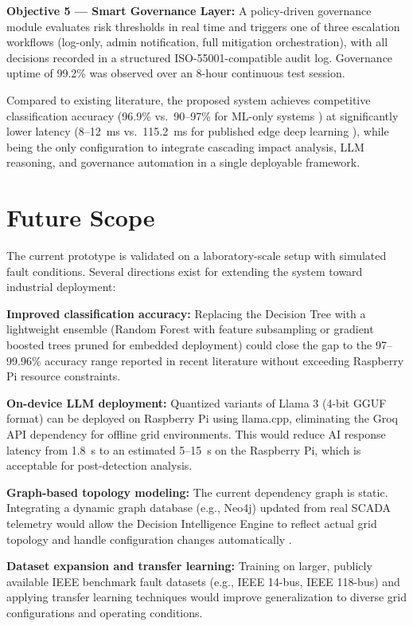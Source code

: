 \textbf{Objective 5 — Smart Governance Layer:} A policy-driven governance module evaluates risk thresholds in real time and triggers one of three escalation workflows (log-only, admin notification, full mitigation orchestration), with all decisions recorded in a structured ISO-55001-compatible audit log. Governance uptime of 99.2\% was observed over an 8-hour continuous test session.

Compared to existing literature, the proposed system achieves competitive classification accuracy (96.9\% vs.\ 90--97\% for ML-only systems \cite{Zhang2025}) at significantly lower latency (8--12~ms vs.\ 115.2~ms for published edge deep learning \cite{EdgeML2024}), while being the only configuration to integrate cascading impact analysis, LLM reasoning, and governance automation in a single deployable framework.

\section{Future Scope}

The current prototype is validated on a laboratory-scale setup with simulated fault conditions. Several directions exist for extending the system toward industrial deployment:

\textbf{Improved classification accuracy:} Replacing the Decision Tree with a lightweight ensemble (Random Forest with feature subsampling or gradient boosted trees pruned for embedded deployment) could close the gap to the 97--99.96\% accuracy range reported in recent literature \cite{Anwar2025,BPASTS2025} without exceeding Raspberry Pi resource constraints.

\textbf{On-device LLM deployment:} Quantized variants of Llama 3 (4-bit GGUF format) can be deployed on Raspberry Pi using llama.cpp, eliminating the Groq API dependency for offline grid environments. This would reduce AI response latency from 1.8~s to an estimated 5--15~s on the Raspberry Pi, which is acceptable for post-detection analysis.

\textbf{Graph-based topology modeling:} The current dependency graph is static. Integrating a dynamic graph database (e.g., Neo4j) updated from real SCADA telemetry would allow the Decision Intelligence Engine to reflect actual grid topology and handle configuration changes automatically \cite{HybridCascade2025}.

\textbf{Dataset expansion and transfer learning:} Training on larger, publicly available IEEE benchmark fault datasets (e.g., IEEE 14-bus, IEEE 118-bus) and applying transfer learning techniques would improve generalization to diverse grid configurations and operating conditions.

